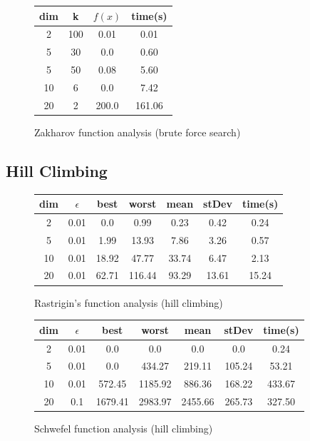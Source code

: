 \documentclass{article}
\begin{document}
\begin{figure}[!h]
	\centering
	\begin{tabular}{|| c | c | c | c || }
		\hline
		dim & k & $f(x)$ & time(s) \\ \hline \hline
		2 & 100 & 0.01 & 0.01 \\ \hline
		5 & 30 & 0.0 & 0.60 \\ \hline
		5 & 50 & 0.08 & 5.60 \\ \hline
		10 & 6 & 0.0 & 7.42 \\ \hline
		20 & 2 & 200.0 & 161.06 \\ \hline
	\end{tabular}
	\caption{Zakharov function analysis (brute force search)}
\end{figure}

\clearpage

\subsection{Hill Climbing}

\begin{figure}[!h]
	\centering
	\begin{tabular}{|| c | c | c | c | c | c | c ||}
		\hline
		dim & $\epsilon$ & best & worst & mean & stDev & time(s) \\ \hline \hline
		2 & 0.01 & 0.0 & 0.99 & 0.23 & 0.42 & 0.24 \\ \hline
		5 & 0.01 & 1.99 & 13.93 & 7.86 & 3.26 & 0.57 \\ \hline
		10 & 0.01 & 18.92 & 47.77 & 33.74 & 6.47 & 2.13 \\ \hline
		20 & 0.01 & 62.71 & 116.44 & 93.29 & 13.61 & 15.24 \\ \hline
	\end{tabular}
	\caption{Rastrigin's function analysis (hill climbing)}
\end{figure}

\begin{figure}[!h]
	\centering
	\begin{tabular}{|| c | c | c | c | c | c | c ||}
		\hline
		dim & $\epsilon$ & best & worst & mean & stDev & time(s) \\ \hline \hline
		2 & 0.01 & 0.0 & 0.0 & 0.0 & 0.0 & 0.24 \\ \hline
		5 & 0.01 & 0.0 & 434.27 & 219.11 & 105.24 & 53.21 \\ \hline
		10 & 0.01 & 572.45 & 1185.92 & 886.36 & 168.22 & 433.67 \\ \hline
		20 & 0.1 & 1679.41 & 2983.97 & 2455.66 & 265.73 & 327.50 \\ \hline
	\end{tabular}
	\caption{Schwefel function analysis (hill climbing)}
\end{figure}
\end{document}
